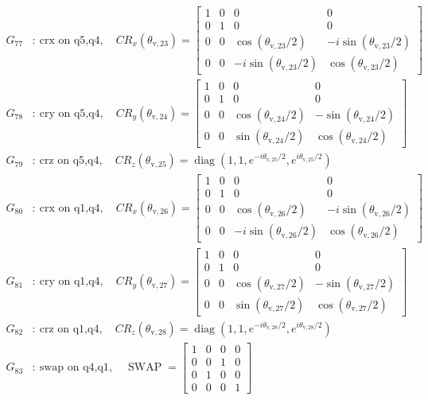 \begin{align*}
G_{77}&:\ \text{crx on q5,q4},\quad CR_x(\theta_{\mathrm{v},23})=\begin{bmatrix}1&0&0&0\\0&1&0&0\\0&0&\cos(\theta_{\mathrm{v},23}/2)&-i\sin(\theta_{\mathrm{v},23}/2)\\0&0&-i\sin(\theta_{\mathrm{v},23}/2)&\cos(\theta_{\mathrm{v},23}/2)\end{bmatrix}\\
G_{78}&:\ \text{cry on q5,q4},\quad CR_y(\theta_{\mathrm{v},24})=\begin{bmatrix}1&0&0&0\\0&1&0&0\\0&0&\cos(\theta_{\mathrm{v},24}/2)&-\sin(\theta_{\mathrm{v},24}/2)\\0&0&\sin(\theta_{\mathrm{v},24}/2)&\cos(\theta_{\mathrm{v},24}/2)\end{bmatrix}\\
G_{79}&:\ \text{crz on q5,q4},\quad CR_z(\theta_{\mathrm{v},25})=\operatorname{diag}(1,1,e^{-i\theta_{\mathrm{v},25}/2},e^{i\theta_{\mathrm{v},25}/2})\\
G_{80}&:\ \text{crx on q1,q4},\quad CR_x(\theta_{\mathrm{v},26})=\begin{bmatrix}1&0&0&0\\0&1&0&0\\0&0&\cos(\theta_{\mathrm{v},26}/2)&-i\sin(\theta_{\mathrm{v},26}/2)\\0&0&-i\sin(\theta_{\mathrm{v},26}/2)&\cos(\theta_{\mathrm{v},26}/2)\end{bmatrix}\\
G_{81}&:\ \text{cry on q1,q4},\quad CR_y(\theta_{\mathrm{v},27})=\begin{bmatrix}1&0&0&0\\0&1&0&0\\0&0&\cos(\theta_{\mathrm{v},27}/2)&-\sin(\theta_{\mathrm{v},27}/2)\\0&0&\sin(\theta_{\mathrm{v},27}/2)&\cos(\theta_{\mathrm{v},27}/2)\end{bmatrix}\\
G_{82}&:\ \text{crz on q1,q4},\quad CR_z(\theta_{\mathrm{v},28})=\operatorname{diag}(1,1,e^{-i\theta_{\mathrm{v},28}/2},e^{i\theta_{\mathrm{v},28}/2})\\
G_{83}&:\ \text{swap on q4,q1},\quad \operatorname{SWAP}=\begin{bmatrix}1&0&0&0\\0&0&1&0\\0&1&0&0\\0&0&0&1\end{bmatrix}\\

\end{align*}
